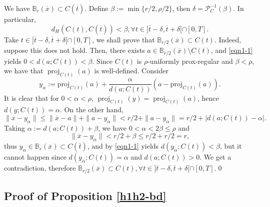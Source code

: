 \documentclass[preprint,12pt]{elsarticle}
\newcommand{\ov}{\overline}
\def \B{\mathbb{B}}
\DeclareMathOperator{\proj}{proj}
\theoremstyle{plain}
\theoremstyle{definition}
\theoremstyle{remark}
\begin{document}
We have $\B_{r}(\ov x)\subset C(\ov t)$. Define $\beta:=\min\{r/2,\rho/2\} $, then $\delta= \mathscr{P}_{C}^{-1}(\beta)$. In particular,
\begin{equation}\label{eqn1-1}
d_H(C(t),C(\ov t))<\beta, \forall t\in ]\ov t-\delta, \ov t +\delta[\cap [0,T].
\end{equation}
Take $t\in ]\ov t-\delta, \ov t +\delta[\cap [0,T]$, we shall prove that $\B_{r/2}(\ov x)\subset C(t)$. Indeed, suppose this does not hold.  Then, there exists $a\in \B_{r/2}(\ov x)\setminus C(t)$, and \eqref{eqn1-1} yields $0<d(a;C(t)) <\beta$. Since $C(t)$ is $\rho$-uniformly prox-regular and $\beta<\rho$, we have that $\proj_{C(t)}(a)$ is well-defined. Consider  
$$y_\alpha:=\text{proj}_{C(t)}(a)+\frac{\alpha}{d(a;C(t))}(a-\text{proj}_{C(t)}(a)).$$ It is clear that for $0<\alpha<\rho$, $\proj_{C(t)}(y) = \proj_{C(t)}(a)$, hence $d(y;C(t)) = \alpha$. On the other hand,  
\begin{equation*}
    \|\ov x-y_\alpha\|\leq \|\ov x-a\| + \|a-y_\alpha\| < r/2+\|a-y_\alpha\|
     = r/2+ |d(a;C(t))-\alpha|.  
\end{equation*}
Taking $\alpha := d(a;C(t))+\beta$, we have $0<\alpha<2\beta\leq \rho$ and $$\|\ov x-y_\alpha\|< r/2+\beta\leq r/2 + r/2 = r,$$ thus $y_\alpha \in \B_{r}(\ov x)\subset C(\ov t)$, and by \eqref{eqn1-1} yields $d(y_\alpha;C(t))<\beta$, but it cannot happen since $d(y_\alpha;C(t)) = \alpha$ and $d(a;C(t))>0$. We get a contradiction, therefore $\mathbb{B}_{r/2}(\ov x)\subset C(t), \forall t\in ]\ov t-\delta, \ov t+\delta[\cap [0,T]$.\qed

\subsection{Proof of Proposition \ref{h1h2-bd}}\label{appendix2}
\end{document}
